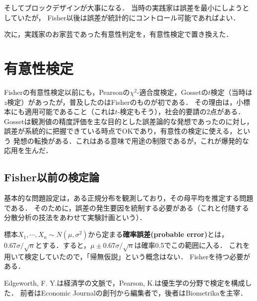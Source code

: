 \documentclass[uplatex,dvipdfmx]{jsreport}
\begin{document}
そしてブロックデザインが大事になる．
当時の実践家は誤差を最小にしようとしていたが，
Fisher以後は誤差が統計的にコントロール可能であればよい．

次に，実践家のお家芸であった有意性判定を，有意性検定で置き換えた．

\section{有意性検定}

\begin{tcolorbox}[colframe=ForestGreen, colback=ForestGreen!10!white,breakable,colbacktitle=ForestGreen!40!white,coltitle=black,fonttitle=\bfseries\sffamily,
title=]
    Fisherの有意性検定以前にも，Pearsonの$\chi^2$-適合度検定，Gossetの$t$検定（当時は$z$検定）があったが，普及したのはFisherのものが初である．
    その理由は，小標本にも適用可能であること（これは$t$-検定もそう），社会的要請の2点がある．
    Gossetは観測値の精度評価を主な目的とした誤差論的な発想であったのに対し，誤差が系統的に把握できている時点でOKであり，有意性の検定に使える，という
    発想の転換がある．これはある意味で用途の制限であるが，これが爆発的な応用を生んだ．
\end{tcolorbox}

\subsection{Fisher以前の検定論}

\begin{history}
    基本的な問題設定は，ある正規分布を観測しており，その母平均を推定する問題である．
    そのために，誤差の発生要因を統制する必要がある（これと付随する分散分析の技法をあわせて実験計画という）．

    標本$X_1,\cdots,X_n\sim N(\mu,\sigma^2)$から定まる\textbf{確率誤差(probable error)}とは，
    $0.67\sigma/\sqrt{n}$とする．すると，$\mu\pm0.67\sigma/\sqrt{n}$は確率0.5でこの範囲に入る．
    これを用いて検定していたので，「帰無仮説」という概念はない．
    Fisherを待つ必要がある．
\end{history}

Edgeworth, F. Y.は経済学の文脈で，Pearson, K.は優生学の分野で検定を構成した．
前者はEconomic Journalの創刊から編集者で，後者はBiometrikaを主宰．
\end{document}
